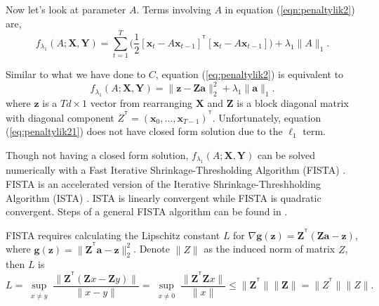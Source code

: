 \documentclass[fleqn]{article}
\let\oldref\ref
\renewcommand{\ref}[1]{(\oldref{#1})}
\newcommand{\T}{^{\ensuremath{\mathsf{T}}}}           %
\providecommand{\mb}[1]{\boldsymbol{#1}}
\newcommand{\bx}{\mb{x}}
\newcommand{\bX}{\mb{X}}
\newcommand{\bY}{\mb{Y}}
\begin{document}
Now let's look at parameter $A$. Terms involving $A$ in equation \ref{eqn:penaltylik2} are,
\begin{equation}\label{eq:penaltylik2}
f_{\lambda_1}(A;\bX,\bY) = \sum\limits_{t=1}^{T}\big(\frac{1}{2}[\bx_t-A\bx_{t-1}]^{\T}[\bx_t-A\bx_{t-1}]\big)+\lambda_1 \|A\|_1.
\end{equation}

Similar to what we have done to $C$, equation \ref{eq:penaltylik2} is equivalent to
\begin{equation}\label{eq:penaltylik21}
f_{\lambda_1}(A;\bX,\bY) =  \|\mathbf{z}  - \mathbf{Za}\|_2^2 + \lambda_1\|\mathbf{a}\|_1.
\end{equation}
where $\mathbf{z}$ is a $Td \times 1$ vector from rearranging $\bX$ and $\mathbf{Z}$ is a block diagonal matrix with diagonal component $Z^{\T} =(\bx_0,\ldots,\bx_{T-1})^{\T}$. Unfortunately, equation \ref{eq:penaltylik21} does not have closed form solution due to the $\ell_1$ term.


Though not having a closed form solution, $f_{\lambda_1}(A;\bX,\bY)$ can be solved numerically with a Fast Iterative Shrinkage-Thresholding Algorithm (FISTA) \cite{beck2009fast}. FISTA is an accelerated version of the Iterative Shrinkage-Threshholding Algorithm (ISTA) \cite{daubechies2004iterative}. ISTA is linearly convergent while FISTA is quadratic convergent. Steps of a general FISTA algorithm can be found in .

FISTA requires calculating the Lipschitz constant $L$ for $\nabla\mathbf{g(z)}=\mathbf{Z}^{\T}(\mathbf{Z}\mathbf{a} -\mathbf{z})$, where $\mathbf{g}(\mathbf{z})=\|\mathbf{Z}^{\T}\mathbf{a} -\mathbf{z}\|_2^2$. Denote $\|Z\|$ as the induced norm of matrix $Z$, then $L$ is
\[
L = \sup_{\substack{x\neq y}}\frac{\|\mathbf{Z}^{\T}(\mathbf{Z}x- \mathbf{Z}y)\|}{\|x-y\|}=\sup_{\substack{x\neq 0}}\frac{\|\mathbf{Z}^{\T}\mathbf{Z}x\|}{\|x\|}\leq\|\mathbf{Z}^{\T}\|\|\mathbf{Z}\| = \|Z^{\T}\|\|Z\|.
\]
\end{document}
